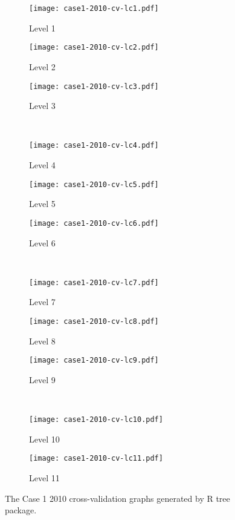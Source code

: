 \begin{appendices}
\begin{figure}[!ht] \centering
	\captionsetup[subfigure]{width=2.0in}
	\begin{subfigure}[t]{0.32\textwidth}
		\texttt{[image: case1-2010-cv-lc1.pdf]}
		\caption{Level 1}
	\end{subfigure}
	\begin{subfigure}[t]{0.32\textwidth}
		\texttt{[image: case1-2010-cv-lc2.pdf]}
		\caption{Level 2}
	\end{subfigure}
	\begin{subfigure}[t]{0.32\textwidth}
		\texttt{[image: case1-2010-cv-lc3.pdf]}
		\caption{Level 3}
	\end{subfigure}\\
	\vspace{5pt}
	\begin{subfigure}[t]{0.32\textwidth}
		\texttt{[image: case1-2010-cv-lc4.pdf]}
		\caption{Level 4}
	\end{subfigure}
	\begin{subfigure}[t]{0.32\textwidth}
		\texttt{[image: case1-2010-cv-lc5.pdf]}
		\caption{Level 5}
	\end{subfigure}
	\begin{subfigure}[t]{0.32\textwidth}
		\texttt{[image: case1-2010-cv-lc6.pdf]}
		\caption{Level 6}
	\end{subfigure}\\
	\vspace{5pt}	
	\begin{subfigure}[t]{0.32\textwidth}
		\texttt{[image: case1-2010-cv-lc7.pdf]}
		\caption{Level 7}
	\end{subfigure}
	\begin{subfigure}[t]{0.32\textwidth}
		\texttt{[image: case1-2010-cv-lc8.pdf]}
		\caption{Level 8}
	\end{subfigure}
	\begin{subfigure}[t]{0.32\textwidth}
		\texttt{[image: case1-2010-cv-lc9.pdf]}
		\caption{Level 9}
	\end{subfigure}\\
	\vspace{5pt}
	\begin{subfigure}[t]{0.32\textwidth}
		\texttt{[image: case1-2010-cv-lc10.pdf]}
		\caption{Level 10}
	\end{subfigure}
	\begin{subfigure}[t]{0.32\textwidth}
		\texttt{[image: case1-2010-cv-lc11.pdf]}
		\caption{Level 11}
	\end{subfigure}
	\vspace{5pt}
	\caption[The Case 1 2010 cross-validation graphs generated by R tree package.]{The Case 1 2010 cross-validation graphs generated by R tree package.}
	\label{fig: appendix-fig.c8.cv}
\end{figure}


\end{appendices}

